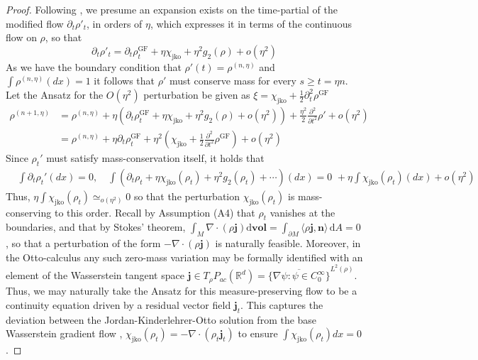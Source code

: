 \documentclass[reqno,11pt,letterpaper]{amsart}
\theoremstyle{plain}
\theoremstyle{definition}
\theoremstyle{remark}
\newcommand{\mb}{\mathbf}
\newcommand{\wass}{\mathrm{GF}}
\newcommand{\jkoreg}{\chi_{\mathrm{jko}}}
\begin{document}
\begin{proof}
Following \cite{barrett2021implicit}, we presume an expansion exists on the time-partial of the modified flow $\partial_{t} \rho'_{t}$, in orders of $\eta$, which expresses it in terms of the continuous flow on $\rho$, so that
\[\partial_{t} \rho'_{t} = \partial_{t} \rho^{\wass}_{t} + \eta \jkoreg + \eta^{2} g_{2}(\rho) + o(\eta^{2}) 
\]
As we have the boundary condition that $\rho'(t) = \rho^{(n,\eta)}$ and $\int \rho^{(n,\eta)}(dx) = 1$ it follows that $\rho'$ must conserve mass for every $s \geq t = \eta n$. Let the Ansatz for the $O(\eta^{2})$ perturbation be given as $\xi = \jkoreg + \frac{1}{2} \partial_{t}^{2} \rho^{\wass}$
\begin{align*}
    \rho^{(n+1,\eta)} &= \rho^{(n,\eta)} + \eta \left( \partial_{t} \rho^{\wass}_{t} + \eta \jkoreg + \eta^{2} g_{2}(\rho) + o(\eta^{2}) \right) + \frac{\eta^{2}}{2} \frac{\partial^{2} }{\partial t^{2}} \rho' + o(\eta^{2}) \\
    & = \rho^{(n,\eta)} + \eta \partial_{t} \rho^{\wass}_{t} + \eta^{2} \left( \jkoreg + \frac{1}{2} \frac{\partial^{2} }{\partial t^{2}} \rho^{\wass} \right) + o(\eta^{2})
\end{align*}
Since $\rho_{t}'$ must satisfy mass-conservation itself, it holds that
\begin{align*}
&\int \partial_{t} \rho_{t}' (dx)= 0,\quad \int \left(
\partial_{t} \rho_{t} + \eta \jkoreg(\rho_{t}) + \eta^{2} g_{2}(\rho_{t}) + \cdots
\right) (dx) = 0 \,\, + \eta\int \jkoreg(\rho_{t})(dx) +o(\eta^{2})
\end{align*}
Thus, $\eta\int \jkoreg(\rho_{t}) \simeq_{o(\eta^{2})} 0$ so that the perturbation $\jkoreg(\rho_{t})$ is mass-conserving to this order. Recall by Assumption (A4) that $\rho_{t}$ vanishes at the boundaries, and that by Stokes' theorem, $\int_{M} \nabla \cdot (\rho \bm{j}) \mathrm{d} \mathrm{\mb{vol}} = \int_{\partial M} \langle \rho \bm{j}, \bm{n} \rangle\, \mathrm{d}A = 0$, so that a perturbation of the form $- \nabla \cdot (\rho \bm{j})$ is naturally feasible. Moreover, in the Otto-calculus any such zero-mass variation may be formally identified with an element of the Wasserstein tangent space $\bm{j} \in T_{\rho}P_{ac}(\mathbb{R}^{d}) = \overline{\{ \nabla\psi: \psi \in C^{\infty}_{0}\}}^{L^{2}(\rho)}.$ Thus, we may naturally take the Ansatz for this measure-preserving flow to be a continuity equation driven by a residual vector field $\bm{j}_{t}$. This captures the deviation between the Jordan-Kinderlehrer-Otto solution \cite{Jordan1998, Halder2017} from the base Wasserstein gradient flow \cite{AGS2008}, $\jkoreg(\rho_{t}) = - \nabla \cdot (\rho_{t} \bm{j}_{t})$ to ensure $\int \jkoreg(\rho_{t}) dx = 0$.


\end{proof}
\end{document}
